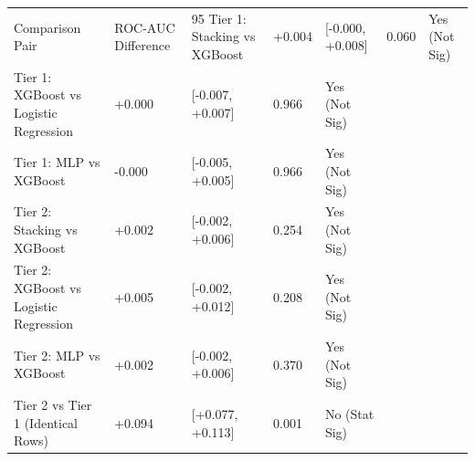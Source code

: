 \begin{tabular}{lllll}
\toprule
Comparison Pair & ROC-AUC Difference & 95%
\midrule
Tier 1: Stacking vs XGBoost & +0.004 & [-0.000, +0.008] & 0.060 & Yes (Not Sig) \\
Tier 1: XGBoost vs Logistic Regression & +0.000 & [-0.007, +0.007] & 0.966 & Yes (Not Sig) \\
Tier 1: MLP vs XGBoost & -0.000 & [-0.005, +0.005] & 0.966 & Yes (Not Sig) \\
Tier 2: Stacking vs XGBoost & +0.002 & [-0.002, +0.006] & 0.254 & Yes (Not Sig) \\
Tier 2: XGBoost vs Logistic Regression & +0.005 & [-0.002, +0.012] & 0.208 & Yes (Not Sig) \\
Tier 2: MLP vs XGBoost & +0.002 & [-0.002, +0.006] & 0.370 & Yes (Not Sig) \\
Tier 2 vs Tier 1 (Identical Rows) & +0.094 & [+0.077, +0.113] & 0.001 & No (Stat Sig) \\
\bottomrule
\end{tabular}

